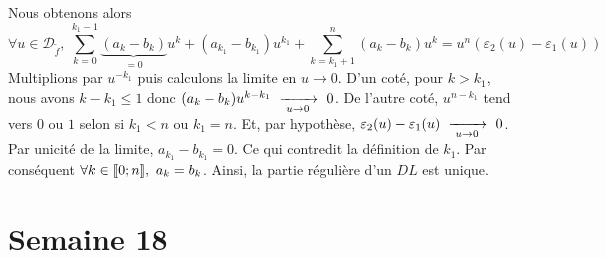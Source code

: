 \documentclass{article}
\renewenvironment{question_kholle}[2][ ]
{
	\subsection{\texorpdfstring{#2}{}}
	\notblank{#1}
	{
		\noindent #1
		\bigbreak
	}
	{}
	\begin{proof}
}
{
	\end{proof}
}
\begin{document}
\begin{question_kholle}
\begin{equation*}
	\end{equation*}
	Nous obtenons alors
	\begin{equation*}
		\forall u \in \mathcal{D}_{\tilde{f}}, \
		\sum_{k=0}^{k_1-1} \underbrace{(a_k - b_k)}_{=0} u^k + (a_{k_1} - b_{k_1}) u^{k_1} + \sum_{k=k_1+1}^{n} (a_k - b_k) u^k = u^n \left( \varepsilon_2(u) - \varepsilon_1(u) \right)
	\end{equation*}
	Multiplions par $u^{-k_1}$ puis calculons la limite en $u \rightarrow 0$.
	D'un coté, pour $k > k_1$, nous avons $k - k_1 \leqslant 1$ donc $(a_k - b_k) u^{k-k_1} \ \xrightarrow[\;u \to 0\;]{}\  0$.
	De l'autre coté, $u^{n-k_1}$ tend vers $0$ ou $1$ selon si $k_1 < n$ ou $k_1 = n$. Et, par hypothèse, $\varepsilon_2(u) - \varepsilon_1(u) \ \xrightarrow[\;u \to 0\;]{}\  0$.
	Par unicité de la limite, $a_{k_1} - b_{k_1} = 0$. Ce qui contredit la définition de $k_1$.
	Par conséquent $\forall k \in [\![ 0;n ]\!], \ a_k = b_k$. Ainsi, la partie régulière d'un $DL$ est unique.
\end{question_kholle}
\pagebreak\section{Semaine 18}
\end{document}
